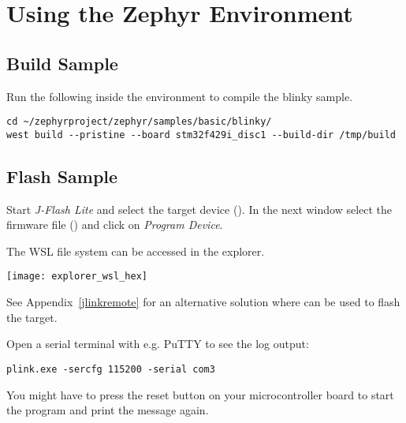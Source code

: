 \newpage

\section{Using the Zephyr Environment}

\subsection{Build Sample}

Run the following inside the environment to compile the blinky sample.

\begin{lstlisting}
cd ~/zephyrproject/zephyr/samples/basic/blinky/
west build --pristine --board stm32f429i_disc1 --build-dir /tmp/build
\end{lstlisting}


\subsection{Flash Sample}

Start \emph{J-Flash Lite} and select the target device (\mcutype{}). In the next
window select the firmware file () and click on
\emph{Program Device}.


\begin{infobox}
  The WSL file system can be accessed in the explorer.
  \begin{center}
    \texttt{[image: explorer\_wsl\_hex]}
  \end{center}
\end{infobox}

See Appendix~\ref{jlinkremote} for an alternative solution where  can be used to flash the target.

Open a serial terminal with e.g. PuTTY to see the log output:

\begin{lstlisting}
plink.exe -sercfg 115200 -serial com3
\end{lstlisting}

You might have to press the reset button on your microcontroller board to start
the program and print the message again.

